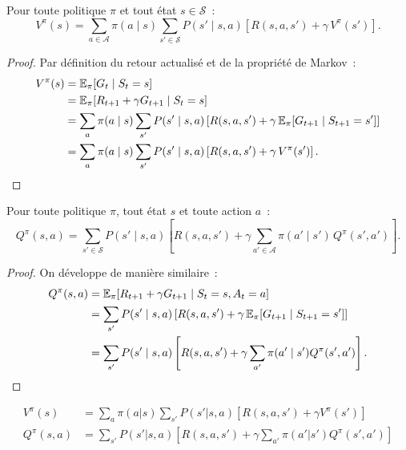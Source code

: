 \begin{theoreme}
Pour toute politique $\pi$ et tout \'etat $s \in \mathcal{S}$~:
\[
    V^\pi(s) = \sum_{a \in \mathcal{A}} \pi(a \mid s) \sum_{s' \in \mathcal{S}}
    P(s' \mid s, a) \left[ R(s, a, s') + \gamma \, V^\pi(s') \right].
\]
\end{theoreme}

\begin{proof}
Par d\'efinition du retour actualis\'e et de la propri\'et\'e de Markov~:
\begin{align*}
    V^\pi(s) &= \mathbb{E}_\pi[G_t \mid S_t = s] \\
    &= \mathbb{E}_\pi[R_{t+1} + \gamma G_{t+1} \mid S_t = s] \\
    &= \sum_{a} \pi(a \mid s) \sum_{s'} P(s' \mid s, a)
       \left[ R(s, a, s') + \gamma \, \mathbb{E}_\pi[G_{t+1} \mid S_{t+1} = s'] \right] \\
    &= \sum_{a} \pi(a \mid s) \sum_{s'} P(s' \mid s, a)
       \left[ R(s, a, s') + \gamma \, V^\pi(s') \right]. \qedhere
\end{align*}
\end{proof}

\begin{theoreme}
Pour toute politique $\pi$, tout \'etat $s$ et toute action $a$~:
\[
    Q^\pi(s, a) = \sum_{s' \in \mathcal{S}} P(s' \mid s, a)
    \left[ R(s, a, s') + \gamma \sum_{a' \in \mathcal{A}} \pi(a' \mid s') \, Q^\pi(s', a') \right].
\]
\end{theoreme}

\begin{proof}
On d\'eveloppe de mani\`ere similaire~:
\begin{align*}
    Q^\pi(s, a) &= \mathbb{E}_\pi[R_{t+1} + \gamma G_{t+1} \mid S_t = s, A_t = a] \\
    &= \sum_{s'} P(s' \mid s, a) \left[ R(s, a, s') +
       \gamma \, \mathbb{E}_\pi[G_{t+1} \mid S_{t+1} = s'] \right] \\
    &= \sum_{s'} P(s' \mid s, a) \left[ R(s, a, s') +
       \gamma \sum_{a'} \pi(a' \mid s') Q^\pi(s', a') \right]. \qedhere
\end{align*}
\end{proof}

\begin{formules}[title=\textbf{\'Equations de Bellman --- R\'esum\'e}]
\begin{align}
    V^\pi(s) &= \sum_a \pi(a|s) \sum_{s'} P(s'|s,a)[R(s,a,s') + \gamma V^\pi(s')]
    \label{eq:bellman_v} \\
    Q^\pi(s,a) &= \sum_{s'} P(s'|s,a)[R(s,a,s') + \gamma \sum_{a'} \pi(a'|s') Q^\pi(s',a')]
    \label{eq:bellman_q}
\end{align}
\end{formules}


